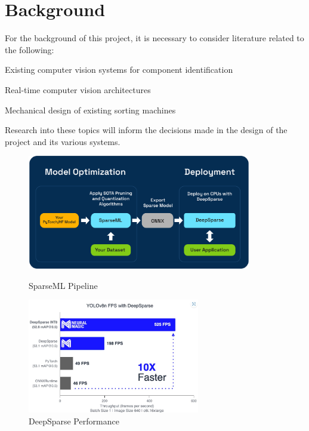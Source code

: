 \section{Background}
\label{sec:background}
For the background of this project, it is necessary to consider literature related to the following:
\begin{mylist}
  \item Existing computer vision systems for component identification
  \item Real-time computer vision architectures
  \item Mechanical design of existing sorting machines
\end{mylist}
Research into these topics will inform the decisions made in the design of the project and its various systems.

\begin{figure}[t]
  \begin{minipage}[t]{0.49\textwidth}
    \centering
    \includegraphics[width=\textwidth,height=5cm]{imgs/articles/sparseml-workflow.png}
    \caption{SparseML Pipeline \cite{sparseml}}
  \end{minipage}
  \hfill
  \begin{minipage}[t]{0.49\textwidth}
      \centering
      \includegraphics[width=\textwidth,height=5cm]{imgs/articles/yoloperf.jpg}
      \caption{DeepSparse Performance \cite{neuralmagic}}
      \end{minipage}
\end{figure}

